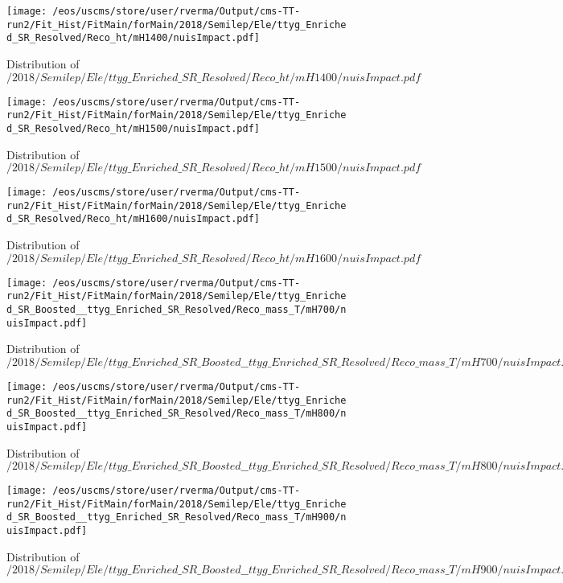 \begin{figure}
\centering
\texttt{[image: /eos/uscms/store/user/rverma/Output/cms-TT-run2/Fit\_Hist/FitMain/forMain/2018/Semilep/Ele/ttyg\_Enriched\_SR\_Resolved/Reco\_ht/mH1400/nuisImpact.pdf]}
\caption{Distribution of $/2018/Semilep/Ele/ttyg\_Enriched\_SR\_Resolved/Reco\_ht/mH1400/nuisImpact.pdf$}
\end{figure}

\begin{figure}
\centering
\texttt{[image: /eos/uscms/store/user/rverma/Output/cms-TT-run2/Fit\_Hist/FitMain/forMain/2018/Semilep/Ele/ttyg\_Enriched\_SR\_Resolved/Reco\_ht/mH1500/nuisImpact.pdf]}
\caption{Distribution of $/2018/Semilep/Ele/ttyg\_Enriched\_SR\_Resolved/Reco\_ht/mH1500/nuisImpact.pdf$}
\end{figure}

\begin{figure}
\centering
\texttt{[image: /eos/uscms/store/user/rverma/Output/cms-TT-run2/Fit\_Hist/FitMain/forMain/2018/Semilep/Ele/ttyg\_Enriched\_SR\_Resolved/Reco\_ht/mH1600/nuisImpact.pdf]}
\caption{Distribution of $/2018/Semilep/Ele/ttyg\_Enriched\_SR\_Resolved/Reco\_ht/mH1600/nuisImpact.pdf$}
\end{figure}

\begin{figure}
\centering
\texttt{[image: /eos/uscms/store/user/rverma/Output/cms-TT-run2/Fit\_Hist/FitMain/forMain/2018/Semilep/Ele/ttyg\_Enriched\_SR\_Boosted\_\_ttyg\_Enriched\_SR\_Resolved/Reco\_mass\_T/mH700/nuisImpact.pdf]}
\caption{Distribution of $/2018/Semilep/Ele/ttyg\_Enriched\_SR\_Boosted\_\_ttyg\_Enriched\_SR\_Resolved/Reco\_mass\_T/mH700/nuisImpact.pdf$}
\end{figure}

\begin{figure}
\centering
\texttt{[image: /eos/uscms/store/user/rverma/Output/cms-TT-run2/Fit\_Hist/FitMain/forMain/2018/Semilep/Ele/ttyg\_Enriched\_SR\_Boosted\_\_ttyg\_Enriched\_SR\_Resolved/Reco\_mass\_T/mH800/nuisImpact.pdf]}
\caption{Distribution of $/2018/Semilep/Ele/ttyg\_Enriched\_SR\_Boosted\_\_ttyg\_Enriched\_SR\_Resolved/Reco\_mass\_T/mH800/nuisImpact.pdf$}
\end{figure}

\begin{figure}
\centering
\texttt{[image: /eos/uscms/store/user/rverma/Output/cms-TT-run2/Fit\_Hist/FitMain/forMain/2018/Semilep/Ele/ttyg\_Enriched\_SR\_Boosted\_\_ttyg\_Enriched\_SR\_Resolved/Reco\_mass\_T/mH900/nuisImpact.pdf]}
\caption{Distribution of $/2018/Semilep/Ele/ttyg\_Enriched\_SR\_Boosted\_\_ttyg\_Enriched\_SR\_Resolved/Reco\_mass\_T/mH900/nuisImpact.pdf$}
\end{figure}

